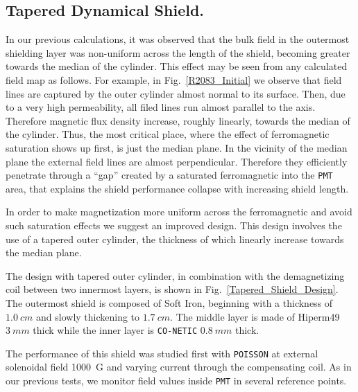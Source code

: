 \documentclass[12pt]{article}
\begin{document}
\subsection{Tapered Dynamical Shield.}
\label{sec:tapered}
In our previous calculations, it was observed that the 
bulk  field  in the outermost shielding layer was 
non-uniform across the length of the shield, becoming greater
towards the median of the cylinder.
This effect may be seen from any calculated field map as follows.
For example, in Fig.~\ref{R2083_Initial}
we observe that field lines are captured  by the outer cylinder almost 
normal to its surface. Then, due to a very high permeability, all filed lines
run  almost parallel to the axis. Therefore  magnetic flux density 
increase, roughly linearly, towards the median of the cylinder. 
Thus, the  most critical  place, where the  effect of  ferromagnetic saturation 
shows up first, is just  the median plane.  In the vicinity of the  median plane 
the external field lines are almost perpendicular. 
Therefore they efficiently penetrate through a ``gap'' created by a 
saturated ferromagnetic into the {\tt PMT} area, that explains the 
shield performance collapse with  increasing  shield length. 

In order to make magnetization more uniform across the ferromagnetic 
and avoid such saturation effects
we suggest an improved  design. This design  involves the use 
of a tapered outer cylinder,
the  thickness of which  linearly increase  towards the median plane.

The design with tapered outer cylinder, in combination with the demagnetizing 
coil  between two innermost layers, is shown in  Fig.~\ref{Tapered_Shield_Design}.
The outermost  shield is composed of Soft Iron, 
beginning with a thickness of $1.0~cm$ and 
slowly thickening to $1.7~cm$. 
The middle layer is made of Hiperm49 $3~mm$ thick while  
the inner layer is {\tt CO-NETIC} $0.8~mm$ thick.

The performance of this  shield 
was studied first  with {\tt POISSON}  at  external solenoidal  field 1000~G and 
varying current through the compensating coil. 
As in our previous tests, we  monitor field values inside {\tt PMT} in several reference points.
\end{document}
